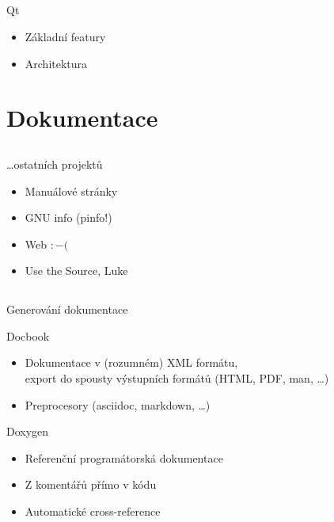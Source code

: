 \documentclass{beamer}
\begin{document}
\subsection{}
\begin{frame}{Qt}
\begin{itemize}
\item Základní featury
\item Architektura
\end{itemize}
\end{frame}


\section{Dokumentace}

\subsection{}
\begin{frame}{\dots ostatních projektů}
\begin{itemize}
\item Manuálové stránky
\item GNU info (pinfo!)
\item Web $:-($
\item Use the Source, Luke
\end{itemize}
\end{frame}

\subsection{}
\begin{frame}{Generování dokumentace}
\begin{center}
\begin{block}{Docbook}
\begin{itemize}
\item Dokumentace v (rozumném) XML formátu, \\ export do spousty výstupních formátů (HTML, PDF, man, \dots)
\item Preprocesory (asciidoc, markdown, \dots)
\end{itemize}
\end{block}
\begin{block}{Doxygen}
\begin{itemize}
\item Referenční programátorská dokumentace
\item Z komentářů přímo v kódu
\item Automatické cross-reference
\end{itemize}
\end{block}
\end{center}
\end{frame}
\end{document}
